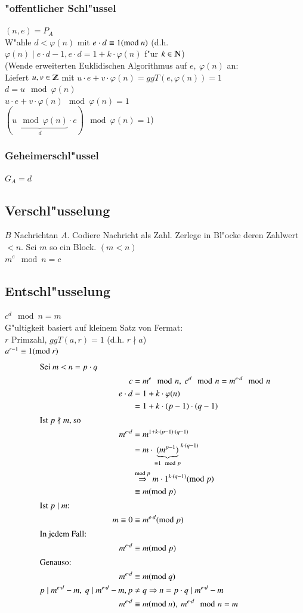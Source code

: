 \subsubsection{"offentlicher Schl"ussel}
$(n,e)=P_A$\\
W"ahle $d < \varphi(n)$ mit $e\cdot d \equiv 1 (\text{mod }n)$ (d.h. $\varphi(n) \mid e \cdot d -1, e\cdot d=1+k\cdot \varphi(n)$ f"ur $k \in \N$)\\
(Wende erweiterten Euklidischen Algorithmus auf $e,\ \varphi(n)$ an:\\
Liefert $u,v \in \Z$ mit $u\cdot e + v\cdot \varphi(n)=ggT(e,\varphi(n))=1$\\
$d=u \mod{\varphi(n)}$\\
$u\cdot e + v \cdot \varphi(n) \mod{\varphi(n)}=1$\\
$( \underbrace{u \mod{\varphi(n)}}_{d} \cdot e)  \mod{\varphi(n)}=1$)
\subsubsection{Geheimerschl"ussel}
$G_A=d$
\subsection{Verschl"usselung}
$B$ Nachrichtan $A$. Codiere Nachricht als Zahl. Zerlege in Bl"ocke deren Zahlwert $< n$. Sei $m$ so ein Block. $(m<n)$\\
$m^e \mod{n} = c$
\subsection{Entschl"usselung}
$c^d \mod{n} = m$\\
G"ultigkeit basiert auf kleinem Satz von Fermat:\\
$r$ Primzahl, $ggT(a,r)=1$ (d.h. $r \nmid a$)\\
$a^{r-1} \equiv 1 (\text{mod }r)$
\begin{align*}
\intertext{Sei $m<n=p\cdot q$}
	c&=m^e \mod{n},\ c^d \mod{n}=m^{e\cdot d} \mod{n}\\	
	e \cdot d &= 1 + k \cdot \varphi (n)\\
						&= 1 + k \cdot (p-1) \cdot (q-1)\\						
\intertext{Ist $p \nmid m$, so} 
	m^{e\cdot d} 	&= m^{1+k \cdot (p-1) \cdot (q-1)}\\
					&= m \cdot {\underbrace{(m^{p-1})}_{\equiv 1 \mod{p}}}^{k \cdot (q-1)} \\
					&\overset{\text{mod }p}{\Rightarrow} m \cdot 1^{k\cdot (q-1)} (\text{mod }p)\\ 
					&\equiv m (\text{mod }p)\\
\intertext{Ist $p \mid m$:}
	m \equiv 0 &\equiv m^{e\cdot d} (\text{mod }p)\\
\intertext{In jedem Fall:}
	m^{e\cdot d} &\equiv m (\text{mod }p)\\
\intertext{Genauso:}
	m^{e\cdot d} &\equiv m (\text{mod }q)\\
	p \mid m^{e\cdot d} - m,\ q  \mid m^{e\cdot d} -m , p&\neq q \Rightarrow n=p\cdot q \mid m^{e\cdot d}-m\\
	m^{e\cdot d} &\equiv m (\text{mod }n),\ m^{e\cdot d}\mod{n} = m
\end{align*}

